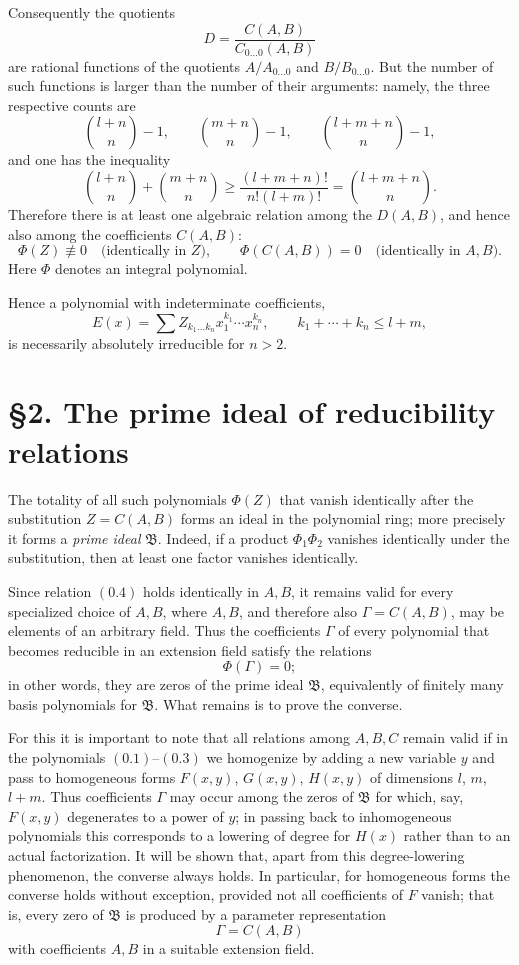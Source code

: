 \documentclass[11pt]{article}
\begin{document}
Consequently the quotients
\[
D = \frac{C(A,B)}{C_{0\dots 0}(A,B)}
\]
are rational functions of the quotients $A/A_{0\dots 0}$ and $B/B_{0\dots 0}$. But the number of such functions is larger than the number of their arguments: namely, the three respective counts are
\[
\binom{l+n}{n}-1,\qquad \binom{m+n}{n}-1,
\qquad \binom{l+m+n}{n}-1,
\]
and one has the inequality
\[
\binom{l+n}{n}+\binom{m+n}{n}
\ge \frac{(l+m+n)!}{n!(l+m)!}
= \binom{l+m+n}{n}.
\]
Therefore there is at least one algebraic relation among the $D(A,B)$, and hence also among the coefficients $C(A,B)$:
\[
\Phi(Z)\not\equiv 0 \quad \text{(identically in $Z$)},
\qquad \Phi(C(A,B))=0 \quad \text{(identically in $A,B$)}.
\tag{0.4}
\]
Here $\Phi$ denotes an integral polynomial.

Hence a polynomial with indeterminate coefficients,
\[
E(x)=\sum Z_{k_1\dots k_n}x_1^{k_1}\cdots x_n^{k_n},
\qquad k_1+\cdots+k_n\le l+m,
\tag{0.5}
\]
is necessarily absolutely irreducible for $n>2$.

\section*{\S 2. The prime ideal of reducibility relations}

The totality of all such polynomials $\Phi(Z)$ that vanish identically after the substitution $Z=C(A,B)$ forms an ideal in the polynomial ring; more precisely it forms a \emph{prime ideal} $\mathfrak B$. Indeed, if a product $\Phi_1\Phi_2$ vanishes identically under the substitution, then at least one factor vanishes identically.

Since relation \((0.4)\) holds identically in $A,B$, it remains valid for every specialized choice of $A,B$, where $A,B$, and therefore also $\Gamma=C(A,B)$, may be elements of an arbitrary field. Thus the coefficients $\Gamma$ of every polynomial that becomes reducible in an extension field satisfy the relations
\[
\Phi(\Gamma)=0;
\]
in other words, they are zeros of the prime ideal $\mathfrak B$, equivalently of finitely many basis polynomials for $\mathfrak B$. What remains is to prove the converse.

For this it is important to note that all relations among $A,B,C$ remain valid if in the polynomials \((0.1)\)--\((0.3)\) we homogenize by adding a new variable $y$ and pass to homogeneous forms $F(x,y)$, $G(x,y)$, $H(x,y)$ of dimensions $l$, $m$, $l+m$. Thus coefficients $\Gamma$ may occur among the zeros of $\mathfrak B$ for which, say, $F(x,y)$ degenerates to a power of $y$; in passing back to inhomogeneous polynomials this corresponds to a lowering of degree for $H(x)$ rather than to an actual factorization. It will be shown that, apart from this degree-lowering phenomenon, the converse always holds. In particular, for homogeneous forms the converse holds without exception, provided not all coefficients of $F$ vanish; that is, every zero of $\mathfrak B$ is produced by a parameter representation
\[
\Gamma=C(A,B)
\]
with coefficients $A,B$ in a suitable extension field.
\end{document}
